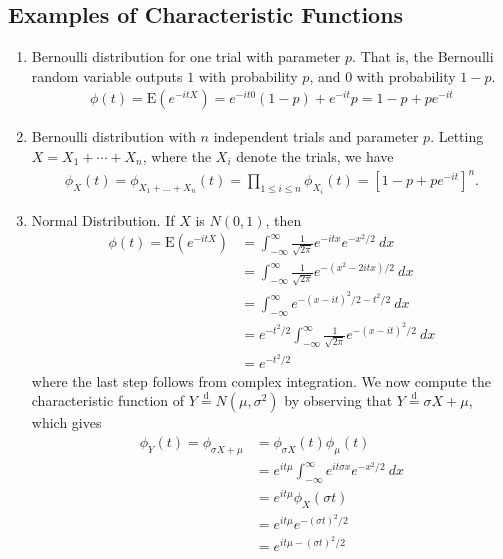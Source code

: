 \subsection{Examples of Characteristic Functions}
\begin{enumerate}
	\item Bernoulli distribution for one trial with parameter $p$. That is,
		the Bernoulli random variable outputs $1$ with probability $p$,
		and $0$ with probability $1-p$.
		\begin{equation*}
			\begin{split}
				\phi(t) = \mathrm{E}(e^{-itX}) = e^{-it0}(1-p) + e^{-it}p = 1-p + pe^{-it}
			\end{split}
		\end{equation*}
	\item Bernoulli distribution with $n$ independent trials and parameter
		$p$. Letting $X = X_{1} + \cdots + X_{n}$, where the $X_i$ denote
		the trials, we have
		\begin{equation*}
			\begin{split}
				\phi_{X}(t) = \phi_{X_{1} + \dots + X_{n}}(t)
				= \prod_{1 \le i \le n} \phi_{X_{i}}(t)
				= \left[ 1-p + pe^{-it} \right]^{n}.
			\end{split}
		\end{equation*}
	\item Normal Distribution. If $X$ is $N(0,1)$, then
		\begin{equation*}
			\begin{split}
				\phi(t) = \mathrm{E}(e^{-itX})
				& = \int_{-\infty}^{\infty} \frac{1}{\sqrt{2 \pi}} e^{-itx}
				e^{-x^{2}/2} \ dx
				\\
				& = \int_{-\infty}^{\infty}\frac{1}{\sqrt{2 \pi}} e^{-(x^{2} -2itx)/2} \
				dx
				\\
				& = \int_{-\infty}^{\infty} e^{-(x-it)^{2}/2 - t^{2}/2} \ dx
				\\
				& = e^{-t^{2}/2} \int_{-\infty}^{\infty} \frac{1}{\sqrt{2 \pi}}
				e^{-(x - it)^{2}/2} \ dx
				\\
				& = e^{-t^{2}/2}
			\end{split}
		\end{equation*}
		where the last step follows from complex integration.	
		We now compute the characteristic function of $Y \overset{\text{d}}{=}N(\mu,
		\sigma^{2})$ by observing that $Y \overset{\text{d}}{=} \sigma X + \mu$,
		which gives
		\begin{equation*}
			\begin{split}
				\phi_{Y}(t) = \phi_{\sigma X + \mu}
				& =  \phi_{\sigma X}(t) \phi_{\mu}(t)
				\\
				& = e^{it\mu} \int_{-\infty}^{\infty} e^{i t \sigma x} e^{-x^{2}/2} \ dx
				\\
				& = e^{it \mu} \phi_{X}(\sigma t)
				\\
				& = e^{it \mu} e^{-( \sigma t)^{2}/2}
				\\
				& = e^{it \mu - (\sigma t)^{2}/2}
			\end{split}
		\end{equation*}
\end{enumerate}
